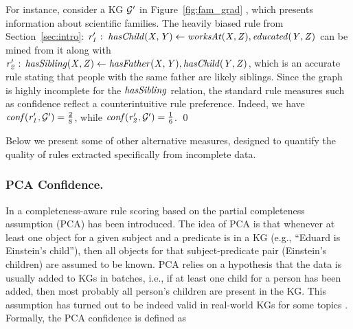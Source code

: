 \begin{example}\label{ex:rulesforgprime}
For instance, consider a KG $\mathcal{G}'$ in Figure~\ref{fig:fam_grad} \cite{carl}, which presents information about scientific families. 
The heavily biased rule from Section~\ref{sec:intro}: $\mathit{r_1':\;hasChild(X,Y)\leftarrow worksAt(X,Z), educated(Y,Z)}$ can be mined from it along with $\mathit{r_2':\,hasSibling(X,Z)\leftarrow hasFather(X,Y),hasChild(Y,Z)}$, which is an accurate rule stating that people with the same father are likely siblings. Since the graph is highly incomplete for the $\mathit{hasSibling}$ relation, the standard rule measures such as confidence reflect a counterintuitive rule preference. Indeed, we have $\mathit{conf(\mathit{r_1',\mathcal{G}'})}=\frac{2}{8}$, while
$\mathit{conf(\mathit{r_2',\mathcal{G}'})}=\frac{1}{6}$. \qed
\end{example}

 Below we present some of other alternative measures, designed 
 to quantify the quality of rules extracted specifically from incomplete data.
 


\subsubsection{PCA Confidence.} In \cite{amie} a completeness-aware rule scoring based
on the partial completeness assumption (PCA) has been introduced. The idea of PCA is that
whenever at least one object for a given subject and a predicate is in a KG (e.g., ``Eduard
is Einstein’s child''), then all objects for that subject-predicate pair (Einstein’s children)
are assumed to be known. PCA relies on a hypothesis that the data is usually
added to KGs in batches, i.e., if at least one child for a person has been added, then most probably
all person's children are present in the KG. This assumption has turned out to be indeed valid in real-world KGs for some topics \cite{amie}. 
Formally, 
the PCA confidence is defined as

